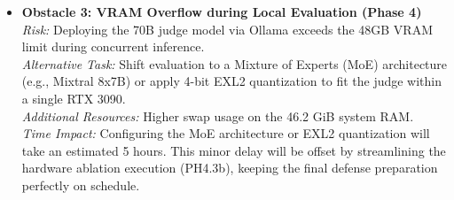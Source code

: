 \begin{itemize}
    \item \textbf{Obstacle 3: VRAM Overflow during Local Evaluation (Phase 4)} \\
    \textit{Risk:} Deploying the 70B judge model via Ollama exceeds the 48GB VRAM limit during concurrent inference. \\
    \textit{Alternative Task:} Shift evaluation to a Mixture of Experts (MoE) architecture (e.g., Mixtral 8x7B) or apply 4-bit EXL2 quantization to fit the judge within a single RTX 3090. \\
    \textit{Additional Resources:} Higher swap usage on the 46.2 GiB system RAM. \\
    \textit{Time Impact:} Configuring the MoE architecture or EXL2 quantization will take an estimated 5 hours. This minor delay will be offset by streamlining the hardware ablation execution (PH4.3b), keeping the final defense preparation perfectly on schedule.
\end{itemize}